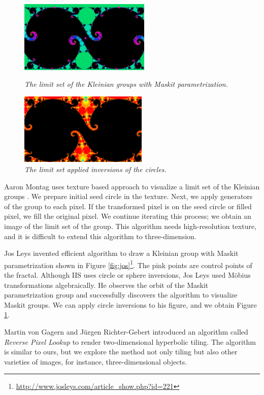 \begin{figure}[htbp]
 \begin{minipage}[t]{0.5\hsize}
  \center
  \includegraphics[height=1.35in, keepaspectratio]{img/preparation/related/josklein.png}
  \caption{\textit{The limit set of the Kleinian groups with Maskit parametrization.}}
  \label{fig:jos}
  \hspace*{\fill}
 \end{minipage}
 \begin{minipage}[t]{0.5\hsize}
  \center
  \includegraphics[height=1.35in, keepaspectratio]{img/preparation/related/joskleinInv.png}
  \caption{\textit{The limit set applied inversions of the circles.}}
  \label{fig:josInv}
  \hspace*{\fill}
 \end{minipage}
\end{figure}

Aaron Montag uses texture based approach to visualize a limit set of the
Kleinian groups \cite{Montag2014hyperbolicIFS}.
We prepare initial seed circle in the texture.
Next, we apply generators of the group to each pixel.
If the transformed pixel is on the seed circle or filled pixel, we fill the original pixel.
We continue iterating this process; we obtain an image of the limit set of
the group.
This algorithm needs high-resolution texture, and it is difficult to
extend this algorithm to three-dimension.

Jos Leys invented efficient algorithm to draw a Kleinian group with Maskit
parametrization shown in Figure
\ref{fig:jos}\footnote{\url{http://www.josleys.com/article_show.php?id=221}}. 
The pink points are control points of the fractal.
Although IIS uses circle or sphere inversions, Jos Leys used
M\"obius transformations algebraically.
He observes the orbit of the Maskit parametrization group and
successfully discovers the algorithm to visualize Maskit groups.
We can apply circle inversions to his figure, and we obtain Figure \ref{fig:josInv}.

Martin von Gagern and J\"urgen Richter-Gebert introduced an algorithm
called \textit{Reverse Pixel Lookup}
\cite{journals/combinatorics/GagernR09} to render two-dimensional
hyperbolic tiling.
The algorithm is similar to ours, but
we explore the method not only tiling but also other varieties of
images, for instance, three-dimensional objects.

